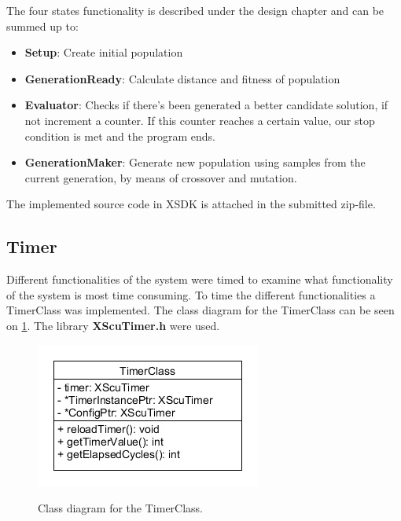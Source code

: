 The four states functionality is described under the design chapter and can be summed up to:

\begin{itemize}
	\item \textbf{Setup}: Create initial population
	\item \textbf{GenerationReady}: Calculate distance and fitness of population
	\item \textbf{Evaluator}: Checks if there's been generated a better candidate solution, if not increment a counter. If this counter reaches a certain value, our stop condition is met and the program ends.
	\item \textbf{GenerationMaker}: Generate new population using samples from the current generation, by means of crossover and mutation.
\end{itemize}

The implemented source code in XSDK is attached in the submitted zip-file.

\subsection{Timer}
Different functionalities of the system were timed to examine what functionality of the system is most time consuming. To time the different functionalities a TimerClass was implemented. The class diagram for the TimerClass can be seen on \cref{fig:TimerClass_CD}. The library \textbf{XScuTimer.h} were used. 
\begin{figure}[H]
	\centering
	{\includegraphics[width=\textwidth/2]{Images/TimerClass_CD.PNG}}\\[0.5cm]
	\caption{Class diagram for the TimerClass.}
	\label{fig:TimerClass_CD}
\end{figure}

